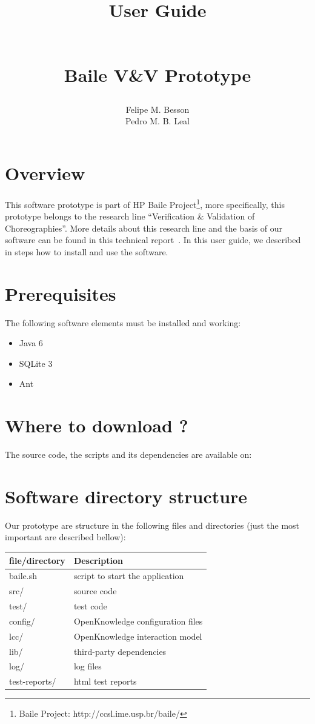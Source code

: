 \documentclass{article}	%
\author{Felipe M. Besson \\ Pedro M. B. Leal}
\title{\begin{huge}\textbf{User Guide}\end{huge} \\ Baile V\&V Prototype}
\begin{document}
	
\maketitle			

\date 

\newpage
\section { Overview }
This software prototype is part of HP Baile Project\footnote{Baile Project: http://ccsl.ime.usp.br/baile/}, more specifically, 
this prototype belongs to the research line ``Verification \& Validation of Choreographies''. More details about this research line and the
basis of our software can be found in this technical report~\cite{tech-report}. In this user guide, we described in steps how to install and use the software.


\section{ Prerequisites}
The following software elements must be installed and working:

\begin{itemize}
 \item Java 6~\cite{java6}
 \item SQLite 3~\cite{sql3}
 \item Ant~\cite{ant}
\end{itemize}

\section{ Where to download ? }
The source code, the scripts and its dependencies are available on:

\section{ Software directory structure}
Our prototype are structure in the following files and directories (just the most important are described bellow):

 \begin{table}[htb]
  \centering
  \begin{tabular}{|l|l|}
  \hline
  file/directory & Description \\
  \hline
  \hline
  baile.sh & script to start the application \\
  src/ & source code \\
  test/ & test code \\
  config/ & OpenKnowledge configuration files \\
  lcc/ & OpenKnowledge interaction model \\
  lib/ & third-party dependencies \\
  log/ & log files \\
  test-reports/ & html test reports \\
  \hline
  \end{tabular}
  \end{table}
\end{document}
